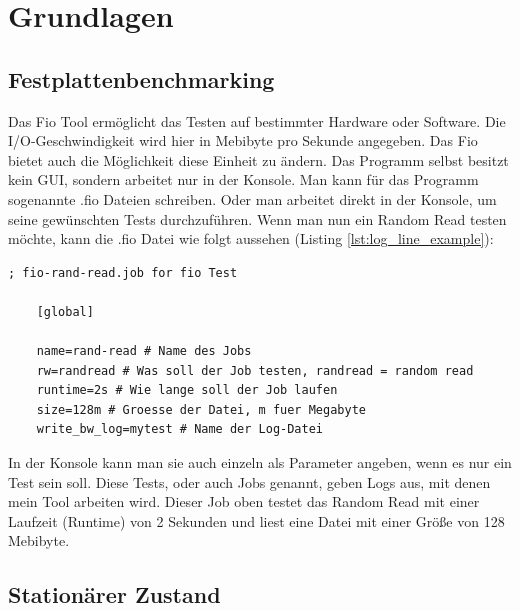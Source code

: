 \documentclass{article}
\begin{document}
\section{Grundlagen}
\subsection{Festplattenbenchmarking}
Das Fio Tool ermöglicht das Testen auf bestimmter Hardware oder Software. Die I/O-Geschwindigkeit wird hier in Mebibyte pro Sekunde angegeben. Das Fio bietet auch die Möglichkeit diese Einheit zu ändern.
Das Programm selbst besitzt kein GUI, sondern arbeitet nur in der Konsole. Man kann für das Programm sogenannte .fio Dateien schreiben. Oder man arbeitet direkt in der Konsole,
um seine gewünschten Tests durchzuführen.
Wenn man nun ein Random Read testen möchte, kann die .fio Datei wie folgt aussehen (Listing \ref{lst:log_line_example}):

\begin{lstlisting}[caption=Beispiel für eine .fio Datei (\# heißt Kommentar),label={lst:fio_file_example}]
    ; fio-rand-read.job for fio Test

    [global]

    name=rand-read # Name des Jobs
    rw=randread # Was soll der Job testen, randread = random read
    runtime=2s # Wie lange soll der Job laufen
    size=128m # Groesse der Datei, m fuer Megabyte
    write_bw_log=mytest # Name der Log-Datei
\end{lstlisting}
\bigskip
In der Konsole kann man sie auch einzeln als Parameter angeben, wenn es nur ein Test sein soll.
Diese Tests, oder auch Jobs genannt, geben Logs aus, mit denen mein Tool arbeiten wird. Dieser Job oben testet das Random Read mit einer
Laufzeit (Runtime) von 2 Sekunden und liest eine Datei mit einer Größe von 128 Mebibyte.

\subsection{Stationärer Zustand}
\end{document}
